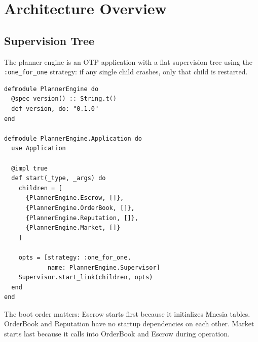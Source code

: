 \documentclass[12pt,a4paper]{article}
\theoremstyle{plain}
\theoremstyle{definition}
\begin{document}
\section{Architecture Overview}\label{sec:architecture}

\subsection{Supervision Tree}

The planner engine is an OTP application with a flat supervision tree using the \texttt{:one\_for\_one} strategy: if any single child crashes, only that child is restarted.

\begin{lstlisting}[caption={Application module and supervision tree},label={lst:app}]
defmodule PlannerEngine do
  @spec version() :: String.t()
  def version, do: "0.1.0"
end

defmodule PlannerEngine.Application do
  use Application

  @impl true
  def start(_type, _args) do
    children = [
      {PlannerEngine.Escrow, []},
      {PlannerEngine.OrderBook, []},
      {PlannerEngine.Reputation, []},
      {PlannerEngine.Market, []}
    ]

    opts = [strategy: :one_for_one,
            name: PlannerEngine.Supervisor]
    Supervisor.start_link(children, opts)
  end
end
\end{lstlisting}

The boot order matters: Escrow starts first because it initializes Mnesia tables. OrderBook and Reputation have no startup dependencies on each other. Market starts last because it calls into OrderBook and Escrow during operation.
\end{document}
